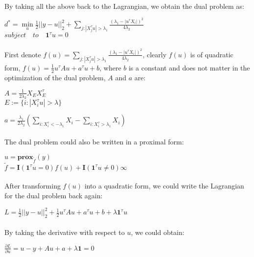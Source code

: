 \documentclass{article}
\begin{document}
\paragraph{}By taking all the above back to the Lagrangian, we obtain the dual problem as:
\begin{center}
$d^{*} = \min\limits_{u} \frac{1}{2}||y-u||_{2}^{2} + \sum\limits_{j: |X_{j}^{\tau}u| > \lambda_{1}}\frac{(\lambda_{1}-|u^{\tau}X_{i}|)^{2}}{4\lambda_{2}}$\\
$subject \quad to \quad \textbf{1}^{\tau}u = 0$
\end{center}
\paragraph{}First denote $f(u) = \sum\limits_{j: |X_{j}^{\tau}u| > \lambda_{1}}\frac{(\lambda_{1}-|u^{\tau}X_{i}|)^{2}}{4\lambda_{2}}$, clearly $f(u)$ is of quadratic form, $f(u) = \frac{1}{2}u^{\tau}Au+a^{\tau}u+b$, where $b$ is a constant and does not matter in the optimization of the dual problem, $A$ and $a$ are:
\begin{center}
$A = \frac{1}{2\lambda_{2}}X_{E}X_{E}^{\tau}$\\
$E := \{i: |X_{i}^{\tau}u| > \lambda \}$
\end{center}
\begin{center}
$a = \frac{\lambda_{1}}{2\lambda_{2}}(\sum\limits_{i:X_{i}^{\tau}<-\lambda_{1}}X_{i}-\sum\limits_{i:X_{i}^{\tau}>\lambda_{1}}X_{i})$
\end{center}
\paragraph{}The dual problem could also be written in a proximal form:
\begin{center}
$\hat{u} = \textbf{prox}_{\tilde{f}}(y)$\\
$\tilde{f} = \textbf{I}(\textbf{1}^{\tau}u=0)f(u) + \textbf{I}(\textbf{1}^{\tau}u \neq 0)\infty$
\end{center}
\paragraph{}After transforming $f(u)$ into a quadratic form, we could write the Lagrangian for the dual problem back again:
\begin{center}
$L = \frac{1}{2}||y-u||_{2}^{2} + \frac{1}{2}u^{\tau}Au+a^{\tau}u+b + \lambda\textbf{1}^{\tau}u$
\end{center}
\paragraph{}By taking the derivative with respect to $u$, we could obtain:
\begin{center}
$\frac{\partial L}{ \partial u} = u - y +Au+a+\lambda\textbf{1} = 0$
\end{center}
\end{document}
